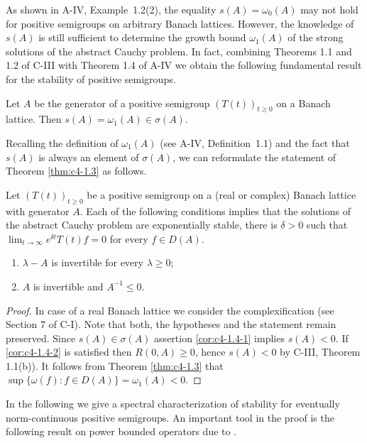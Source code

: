 As shown in A-IV, Example~1.2(2), the equality $s(A) = \omega_{0}(A)$ may not hold for positive semigroups on arbitrary Banach lattices.
However, the knowledge of $s(A)$ is still sufficient to determine the growth bound $\omega_{1}(A)$ of the strong solutions of the abstract Cauchy problem.
In fact, combining Theorems 1.1 and 1.2 of C-III with Theorem 1.4 of A-IV we obtain the following fundamental result for the stability of positive semigroups.
\begin{theorem}\label{thm:c4-1.3}
Let $A$ be the generator of a positive semigroup $(T(t))_{t\geq 0}$ on a Banach lattice.
Then $s(A) = \omega_{1}(A) \in \sigma(A)$.
\end{theorem}
Recalling the definition of $\omega_{1}(A)$ (see A-IV, Definition~1.1) and the fact that $s(A)$ is always an element of $\sigma(A)$, we can reformulate the statement of Theorem \ref{thm:c4-1.3} as follows.
\begin{corollary}\label{cor:c4-1.4}
%
%
%
Let $(T(t))_{t\geq 0}$ be a positive semigroup on a (real or complex) Banach lattice with generator $A$.
Each of the following conditions implies that the solutions of the abstract Cauchy problem are exponentially stable, \ie  there is $\delta > 0$ such that $\lim_{t \to \infty} e^{\delta t}T(t)f = 0$ for every $f \in D(A)$.
\begin{enumerate}[\upshape (i)]
    \item \label{cor:c4-1.4-1}
    $\lambda - A$ is invertible for every $\lambda \geq 0$;
    \item \label{cor:c4-1.4-2}
    $A$ is invertible and $A^{-1} \leq 0$.
    \end{enumerate}
\end{corollary}
\begin{proof}
In case of a real Banach lattice we consider the complexification (see Section 7 of C-I).
Note that both, the hypotheses and the statement remain preserved.
Since $s(A) \in \sigma(A)$ assertion \ref{cor:c4-1.4-1} implies $s(A) < 0$.
If \ref{cor:c4-1.4-2} is satisfied then $R(0,A) \geq 0$, hence $s(A) < 0$ by C-III, Theorem 1.1(b)).
It follows from Theorem \ref{thm:c4-1.3} that $\sup\{\omega(f) \colon f \in D(A)\} = \omega_{1}(A) < 0$.
\end{proof}
In the following we give a spectral characterization of stability for eventually norm-continuous positive semigroups.
An important tool in the proof is the following result on power bounded operators due to \citet{katznelsontzafriri:1984}.
